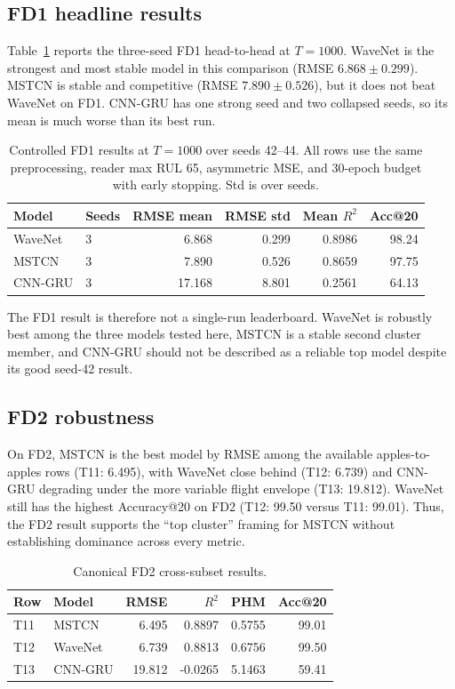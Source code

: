 \subsection{FD1 headline results}

Table~\ref{tab:fd1} reports the three-seed FD1 head-to-head at $T{=}1000$. WaveNet is the strongest and most stable model in this comparison (RMSE $6.868\pm0.299$). MSTCN is stable and competitive (RMSE $7.890\pm0.526$), but it does not beat WaveNet on FD1. CNN-GRU has one strong seed and two collapsed seeds, so its mean is much worse than its best run.

\begin{table}[t]
\centering
\caption{Controlled FD1 results at $T{=}1000$ over seeds 42--44.
  All rows use the same preprocessing, reader max RUL 65, asymmetric MSE,
  and 30-epoch budget with early stopping. Std is over seeds.}
\label{tab:fd1}
\small
\begin{tabular}{llrrrr}
\toprule
Model & Seeds & RMSE mean & RMSE std & Mean $R^2$ & Acc@20 \\
\midrule
WaveNet & 3 & 6.868 & 0.299 & 0.8986 & 98.24 \\
MSTCN & 3 & 7.890 & 0.526 & 0.8659 & 97.75 \\
CNN-GRU & 3 & 17.168 & 8.801 & 0.2561 & 64.13 \\
\bottomrule
\end{tabular}
\end{table}

The FD1 result is therefore not a single-run leaderboard. WaveNet is robustly best among the three models tested here, MSTCN is a stable second cluster member, and CNN-GRU should not be described as a reliable top model despite its good seed-42 result.

\subsection{FD2 robustness}

On FD2, MSTCN is the best model by RMSE among the available apples-to-apples rows (T11: 6.495), with WaveNet close behind (T12: 6.739) and CNN-GRU degrading under the more variable flight envelope (T13: 19.812). WaveNet still has the highest Accuracy@20 on FD2 (T12: 99.50 versus T11: 99.01). Thus, the FD2 result supports the ``top cluster'' framing for MSTCN without establishing dominance across every metric.

\begin{table}[t]
\centering
\caption{Canonical FD2 cross-subset results.}
\label{tab:fd2}
\small
\begin{tabular}{llrrrr}
\toprule
Row & Model & RMSE & $R^2$ & PHM & Acc@20 \\
\midrule
T11 & MSTCN & 6.495 & 0.8897 & 0.5755 & 99.01 \\
T12 & WaveNet & 6.739 & 0.8813 & 0.6756 & 99.50 \\
T13 & CNN-GRU & 19.812 & -0.0265 & 5.1463 & 59.41 \\
\bottomrule
\end{tabular}
\end{table}


